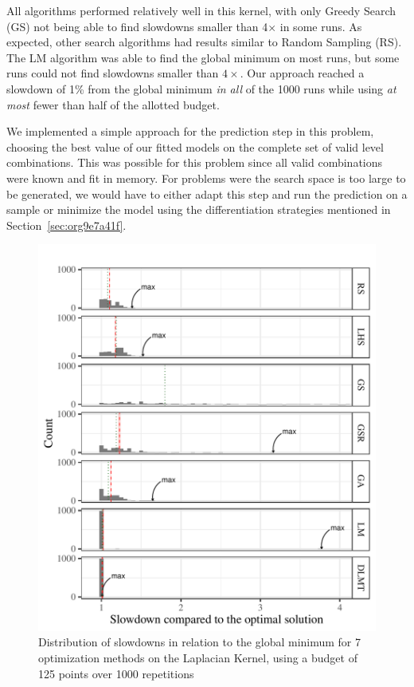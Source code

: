 \documentclass[conference]{IEEEtran}
\begin{document}
All algorithms performed relatively well in this kernel, with only Greedy Search
(GS) not being able to find slowdowns smaller than 4\(\times\) in some runs. As
expected, other search algorithms had results similar to Random Sampling (RS).
The LM algorithm was able to find the global minimum on most runs, but some runs
could not find slowdowns smaller than \(4\times\). Our approach reached a slowdown
of 1\% from the global minimum \emph{in all} of the 1000 runs while using \emph{at most}
fewer than half of the allotted budget.

We implemented a simple approach for the prediction step in this problem,
choosing the best value of our fitted models on the complete set of valid level
combinations. This was possible for this problem since all valid combinations
were known and fit in memory. For problems were the search space is too large to
be generated, we would have to either adapt this step and run the prediction on
a sample or minimize the model using the differentiation strategies mentioned
in Section~\ref{sec:org9e7a41f}.

\begin{figure}[t]\vspace{-.5cm}
\centering
\includegraphics[width=.9\columnwidth]{./img/comparison_histogram.pdf}
\caption{\label{fig:org531c416}
Distribution of slowdowns in relation to the global minimum for 7 optimization methods on the Laplacian Kernel, using a budget of 125 points over 1000 repetitions \vspace{-.5cm}}
\end{figure}
\end{document}
